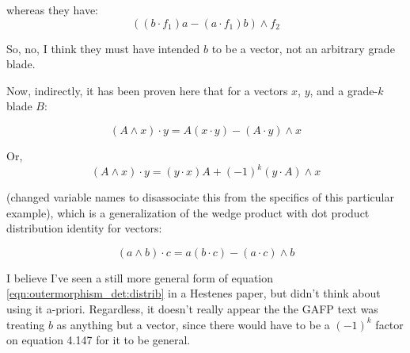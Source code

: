 whereas they have:
\begin{equation*}
\left( (b \cdot f_1) a - (a \cdot f_1) b \right) \wedge f_2
\end{equation*}

So, no, I think they must have intended $b$ to be a vector, not an
arbitrary grade blade.

Now, indirectly, it has been 
proven here that for a vectors $x$, $y$, and a grade-$k$ blade $B$:

\begin{equation}\label{eqn:outermorphism_det:distrib}
(A \wedge x) \cdot y = A ( x \cdot y ) - ( A \cdot y ) \wedge x
\end{equation}

Or,
\begin{equation}
(A \wedge x) \cdot y = ( y \cdot x ) A + (-1)^{k}( y \cdot A ) \wedge x
\end{equation}

(changed variable names to disassociate this from the specifics of this 
particular example), which is a generalization of the wedge product with 
dot product distribution identity for vectors:

\begin{equation}
(a \wedge b) \cdot c = a ( b \cdot c ) - ( a \cdot c ) \wedge b
\end{equation}

I believe I've seen a still more general form of equation \ref{eqn:outermorphism_det:distrib}
in a
Hestenes paper, but didn't think about using it a-priori.  Regardless, it
doesn't really appear the the GAFP text was treating $b$ as anything but a
vector, since there would have to be a $(-1)^k$ factor on equation 4.147 for
it to be general.

